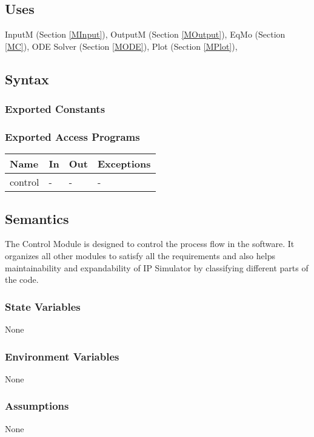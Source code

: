 \documentclass[12pt, titlepage]{article}
\begin{document}
\subsection{Uses}
InputM (Section \ref{MInput}),
OutputM (Section \ref{MOutput}),
EqMo (Section \ref{MC}),
ODE Solver (Section \ref{MODE}),
Plot (Section \ref{MPlot}),

\subsection{Syntax}

\subsubsection{Exported Constants}

\subsubsection{Exported Access Programs}

\begin{center}
\begin{tabular}{p{2cm} p{4cm} p{4cm} p{2cm}}
\hline
\textbf{Name} & \textbf{In} & \textbf{Out} & \textbf{Exceptions} \\
\hline
control & - & - & - \\
\hline
\end{tabular}
\end{center}

\subsection{Semantics}
The Control Module is designed to control the process flow in the software. It organizes all other modules to satisfy all the requirements and also helps maintainability and expandability of IP Simulator by classifying different parts of the code.
\subsubsection{State Variables}
None
\subsubsection{Environment Variables}
None
\subsubsection{Assumptions}
None
\end{document}
